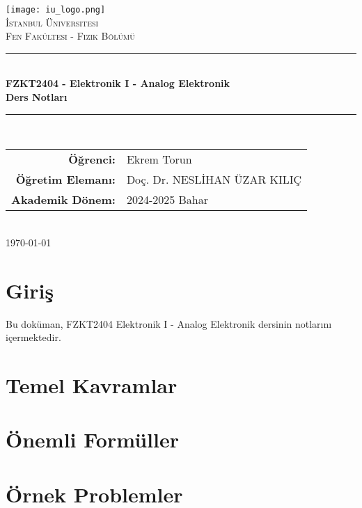 \documentclass[12pt,a4paper]{article}
\begin{document}
\begin{titlepage}
    \centering
    \texttt{[image: iu\_logo.png]}\\[1cm]
    {\scshape\LARGE İstanbul Üniversitesi\\}
    {\scshape\Large Fen Fakültesi - Fizik Bölümü\\[0.5cm]}
    \rule{\linewidth}{0.2mm} \\[0.4cm]
    { \huge \bfseries FZKT2404 - Elektronik I - Analog Elektronik\\
    Ders Notları\\[0.4cm] }
    \rule{\linewidth}{0.2mm} \\[1.5cm]
    
    {\large
    \begin{tabular}{rl}
        \textbf{Öğrenci:} & Ekrem Torun \\
        \textbf{Öğretim Elemanı:} & Doç. Dr. NESLİHAN ÜZAR KILIÇ \\
        \textbf{Akademik Dönem:} & 2024-2025 Bahar \\
    \end{tabular}}\\[2cm]
    
    {\large \today}
\end{titlepage}

\tableofcontents
\newpage

\section{Giriş}
Bu doküman, FZKT2404 Elektronik I - Analog Elektronik dersinin notlarını içermektedir.

\section{Temel Kavramlar}

\section{Önemli Formüller}

\section{Örnek Problemler}
\end{document}
